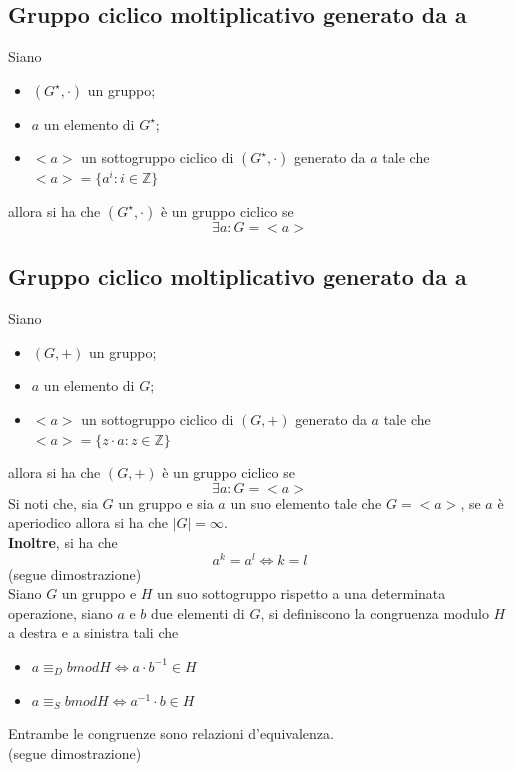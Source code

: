 \begin{flushleft}
\subsection{Gruppo ciclico moltiplicativo generato da a}
Siano
\begin{itemize}
    \item $(G^\star, \cdot)$ un gruppo;
    \item $a$ un elemento di $G^\star$;
    \item $<a>$ un sottogruppo ciclico di $(G^\star, \cdot)$ generato da $a$ tale che $<a> = \{a^i: i\in \mathbb{Z}\}$
\end{itemize}
allora si ha che $(G^\star, \cdot)$ è un gruppo ciclico se
\[\exists a: G=<a>\]

\subsection{Gruppo ciclico moltiplicativo generato da a}
Siano
\begin{itemize}
    \item $(G, +)$ un gruppo;
    \item $a$ un elemento di $G$;
    \item $<a>$ un sottogruppo ciclico di $(G, +)$ generato da $a$ tale che $<a> = \{z\cdot a: z\in \mathbb{Z}\}$
\end{itemize}
allora si ha che $(G, +)$ è un gruppo ciclico se
\[\exists a: G=<a>\]
Si noti che, sia $G$ un gruppo e sia $a$ un suo elemento tale che $G=<a>$, se $a$ è aperiodico allora si ha che $|G| = \infty$.\\
\textbf{Inoltre}, si ha che
\[a^k = a^l \Leftrightarrow k = l\]
(segue dimostrazione)
\\ \vspace{300px}
\vspace{10px}
Siano $G$ un gruppo e $H$ un suo sottogruppo rispetto a una determinata operazione, siano $a$ e $b$ due elementi di $G$, si definiscono la congruenza modulo $H$ a destra e a sinistra tali che
\begin{itemize}
    \item $a\equiv_D b mod H \Leftrightarrow a\cdot b^{-1} \in H$
    \item $a\equiv_S b mod H \Leftrightarrow a^{-1}\cdot b \in H$
\end{itemize}
Entrambe le congruenze sono relazioni d'equivalenza.\\
(segue dimostrazione)
\\ \vspace{300px}


\end{flushleft}
